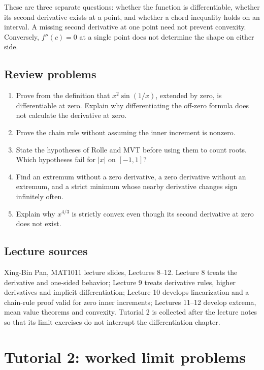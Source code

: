 \documentclass[11pt,a4paper]{article}
\begin{document}
These are three separate questions: whether the function is
differentiable, whether its second derivative exists at a point, and
whether a chord inequality holds on an interval. A missing second
derivative at one point need not prevent convexity. Conversely,
\(f''(c)=0\) at a single point does not determine the shape on either
side.

\subsection{Review problems}\label{review-problems}

\begin{enumerate}
\def\labelenumi{\arabic{enumi}.}
\item
  Prove from the definition that \(x^2\sin(1/x)\), extended by zero, is
  differentiable at zero. Explain why differentiating the off-zero
  formula does not calculate the derivative at zero.
\item
  Prove the chain rule without assuming the inner increment is nonzero.
\item
  State the hypotheses of Rolle and MVT before using them to count
  roots. Which hypotheses fail for \(|x|\) on \([-1,1]\)?
\item
  Find an extremum without a zero derivative, a zero derivative without
  an extremum, and a strict minimum whose nearby derivative changes sign
  infinitely often.
\item
  Explain why \(x^{4/3}\) is strictly convex even though its second
  derivative at zero does not exist.
\end{enumerate}

\subsection{Lecture sources}\label{lecture-sources}

Xing-Bin Pan, MAT1011 lecture slides, Lectures 8--12. Lecture 8 treats
the derivative and one-sided behavior; Lecture 9 treats derivative
rules, higher derivatives and implicit differentiation; Lecture 10
develops linearization and a chain-rule proof valid for zero inner
increments; Lectures 11--12 develop extrema, mean value theorems and
convexity. Tutorial 2 is collected after the lecture notes so that its
limit exercises do not interrupt the differentiation chapter.

\section{Tutorial 2: worked limit
problems}\label{tutorial-2-worked-limit-problems}
\end{document}
